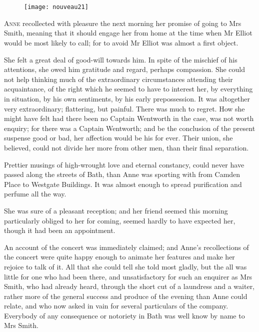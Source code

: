 \chapter[Chapter \thechapter]{}

\begin{figure}[t!]
\centering
\texttt{[image: nouveau21]}
\end{figure}

\lettrine[lines=4,lraise=0.3]{A}{nne} recollected with pleasure the next morning her promise of going to Mrs Smith, meaning that it should engage her from home at the time when Mr Elliot would be most likely to call; for to avoid Mr Elliot was almost a first object.

She felt a great deal of good-will towards him. In spite of the mischief of his attentions, she owed him gratitude and regard, perhaps compassion. She could not help thinking much of the extraordinary circumstances attending their acquaintance, of the right which he seemed to have to interest her, by everything in situation, by his own sentiments, by his early prepossession. It was altogether very extraordinary; flattering, but painful. There was much to regret. How she might have felt had there been no Captain Wentworth in the case, was not worth enquiry; for there was a Captain Wentworth; and be the conclusion of the present suspense good or bad, her affection would be his for ever. Their union, she believed, could not divide her more from other men, than their final separation.

Prettier musings of high-wrought love and eternal constancy, could never have passed along the streets of Bath, than Anne was sporting with from Camden Place to Westgate Buildings. It was almost enough to spread purification and perfume all the way.

She was sure of a pleasant reception; and her friend seemed this morning particularly obliged to her for coming, seemed hardly to have expected her, though it had been an appointment.

An account of the concert was immediately claimed; and Anne's recollections of the concert were quite happy enough to animate her features and make her rejoice to talk of it. All that she could tell she told most gladly, but the all was little for one who had been there, and unsatisfactory for such an enquirer as Mrs Smith, who had already heard, through the short cut of a laundress and a waiter, rather more of the general success and produce of the evening than Anne could relate, and who now asked in vain for several particulars of the company. Everybody of any consequence or notoriety in Bath was well know by name to Mrs Smith.

